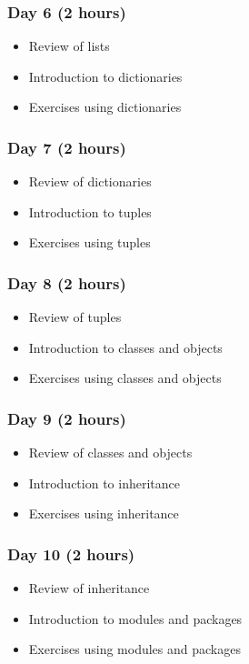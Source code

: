 \documentclass[11pt]{article}
\begin{document}
\subsubsection*{Day 6 (2 hours)}
\label{sec:org92705b8}

\begin{itemize}
\item Review of lists
\item Introduction to dictionaries
\item Exercises using dictionaries
\end{itemize}
\subsubsection*{Day 7 (2 hours)}
\label{sec:org5bf3757}

\begin{itemize}
\item Review of dictionaries
\item Introduction to tuples
\item Exercises using tuples
\end{itemize}
\subsubsection*{Day 8 (2 hours)}
\label{sec:org66479b9}

\begin{itemize}
\item Review of tuples
\item Introduction to classes and objects
\item Exercises using classes and objects
\end{itemize}
\subsubsection*{Day 9 (2 hours)}
\label{sec:org8047788}

\begin{itemize}
\item Review of classes and objects
\item Introduction to inheritance
\item Exercises using inheritance
\end{itemize}
\subsubsection*{Day 10 (2 hours)}
\label{sec:orgc12e75e}

\begin{itemize}
\item Review of inheritance
\item Introduction to modules and packages
\item Exercises using modules and packages
\end{itemize}
\end{document}
